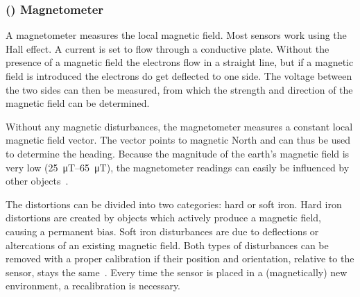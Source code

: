 \subsubsection{() Magnetometer}
A magnetometer measures the local magnetic field.
Most sensors work using the Hall effect.
A current is set to flow through a conductive plate.
Without the presence of a magnetic field the electrons flow in a straight line, but if a magnetic field is introduced the electrons do get deflected to one side.
The voltage between the two sides can then be measured, from which the strength and direction of the magnetic field can be determined.\par
Without any magnetic disturbances, the magnetometer measures a constant local magnetic field vector.
The vector points to magnetic North and can thus be used to determine the heading.
Because the magnitude of the earth's magnetic field is very low (\SIrange{25}{65}{\micro\tesla}), the magnetometer readings can easily be influenced by other objects~\cite{Kok2016}.\par
The distortions can be divided into two categories: hard or soft iron.
Hard iron distortions are created by objects which actively produce a magnetic field, causing a permanent bias.
Soft iron disturbances are due to deflections or altercations of an existing magnetic field.
Both types of disturbances can be removed with a proper calibration if their position and orientation, relative to the sensor, stays the same~\cite{Guo2008}.
Every time the sensor is placed in a (magnetically) new environment, a recalibration is necessary.

